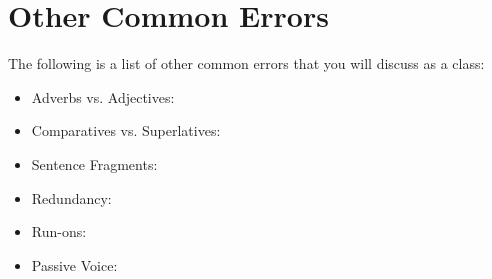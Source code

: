 \section{Other Common Errors}

The following is a list of other common errors that you will discuss as a class:
\begin{itemize}
 \item{Adverbs vs. Adjectives:} \hrulefill
\item{Comparatives vs. Superlatives:} \hrulefill
\item{Sentence Fragments:} \hrulefill
\item{Redundancy:} \hrulefill
\item{Run-ons:} \hrulefill
\item{Passive Voice: } \hrulefill

\end{itemize} 